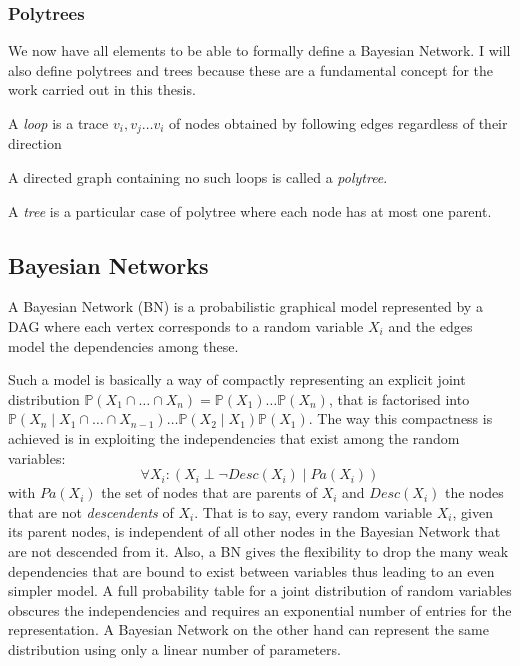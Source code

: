 \subsubsection{Polytrees}
We now have all elements to be able to formally define a Bayesian Network.
I will also define polytrees and trees because these are a fundamental concept for the work carried out in this thesis.
\begin{definition}
	A \textit{loop} is a trace $v_i, v_j \ldots v_i$ of nodes obtained by following edges regardless of their direction
\end{definition}
\begin{definition}
	A directed graph containing no such loops is called a \textit{polytree}. 
\end{definition}
\begin{definition}
	A \textit{tree} is a particular case of polytree where each node has at most one parent.	
\end{definition}

\subsection{Bayesian Networks}
\begin{definition}
	A Bayesian Network (BN) is a probabilistic graphical model represented by a DAG where each vertex corresponds to a random variable $X_i$ and the edges model the dependencies among these.
\end{definition}
Such a model is basically a way of compactly representing an explicit joint distribution $\mathbb{P}(X_1 \cap \ldots \cap X_n) = \mathbb{P}(X_1) \ldots \mathbb{P}(X_n)$, that is factorised into $\mathbb{P}(X_n \mid X_1 \cap \ldots \cap X_{n-1}) \ldots \mathbb{P}(X_2 \mid X_1 ) \mathbb{P}(X_1) $.
The way this compactness is achieved is in exploiting the independencies that exist among the random variables:
\begin{equation} \label{eq:bnindependencies}
	\forall X_i:  ( X_i \perp \neg Desc(X_i) \mid Pa(X_i))
\end{equation}
with $Pa(X_i)$ the set of nodes that are parents of $X_i$ and $Desc(X_i)$ the nodes that are not \textit{descendents} of $X_i$.
That is to say, every random variable $X_i$, given its parent nodes, is independent of all other nodes in the Bayesian Network that are not descended from it.
Also, a BN gives the flexibility to drop the many weak dependencies that are bound to exist between variables thus leading to an even simpler model.
A full probability table for a joint distribution of random variables obscures the independencies and requires an exponential number of entries for the representation.
A Bayesian Network on the other hand can represent the same distribution using only a linear number of parameters.


